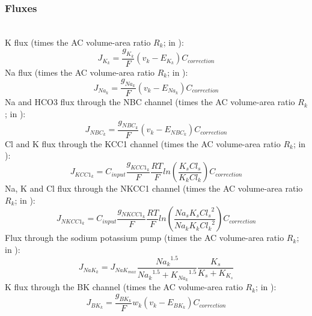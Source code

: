 \subsubsection{Fluxes}~\\
%
\gls{K} flux (times the AC volume-area ratio $R_k$; in \uMmps): 
\begin{equation} \label{eq:J_K}
J_{K_k}=\frac{g_{K_{k}}}{F}(v_k - E_{K_k}) C_{correction}
\end{equation}
%
\gls{Na} flux (times the AC volume-area ratio $R_k$; in \uMmps):
\begin{equation} \label{eq:J_Na}
J_{Na_k}=\frac{g_{Na_{k}}}{F}(v_k - E_{Na_k}) C_{correction}
\end{equation}
%
\gls{Na} and \gls{HCO3} flux through the NBC channel  (times the AC volume-area ratio $R_k$; in \uMmps): 
\begin{equation} \label{eq:J_NBC}
J_{NBC_k}=\frac{g_{NBC_k}}{F}\left(  v_k -E_{NBC_k}  \right) C_{correction}
\end{equation}
%
\gls{Cl} and \gls{K} flux through the KCC1 channel  (times the AC volume-area ratio $R_k$; in \uMmps): 
\begin{equation} \label{eq:J_KCC1}
J_{KCC1_k}=C_{input}\frac{g_{KCC1_k}}{F}\frac{RT}{F}ln \left(\frac{K_s Cl_s }{K_k Cl_k}\right) C_{correction}
\end{equation}
%
\gls{Na}, \gls{K} and \gls{Cl} flux through the NKCC1 channel   (times the AC volume-area ratio $R_k$; in \uMmps): 
\begin{equation} \label{eq:J_NKCC1}
J_{NKCC1_k}=C_{input}\frac{g_{NKCC1_k}}{F}\frac{RT}{F}ln \left(\frac{Na_s K_s {Cl_s}^2}{Na_k K_k {Cl_k}^2}\right) C_{correction}
\end{equation}
%
Flux through the sodium potassium pump   (times the \gls{AC} volume-area ratio $R_k$; in \uMmps): 
\begin{equation} \label{eq:J_NaK_s}
J_{NaK_{k}}=J_{NaK_{max}}\frac{{Na_k}^{1.5}}{{Na_k}^{1.5}+{K_{Na_k}}^{1.5}}\frac{K_s}{K_s+K_{K_s}}
\end{equation}
%
\gls{K} flux through the BK channel  (times the \gls{AC} volume-area ratio $R_k$; in \uMmps): 
\begin{equation} \label{eq:J_BK}
J_{BK_k}=\frac{g_{BK_k}}{F}w_k\left( v_k-E_{BK_k} \right) C_{correction}
\end{equation}
%
%
%
